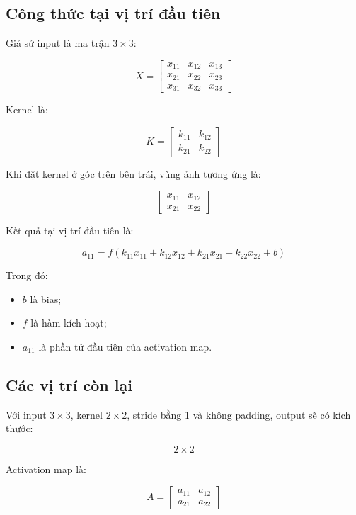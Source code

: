 \subsection{Công thức tại vị trí đầu tiên}

Giả sử input là ma trận $3 \times 3$:

\[
    X =
    \begin{bmatrix}
    x_{11} & x_{12} & x_{13}\\
    x_{21} & x_{22} & x_{23}\\
    x_{31} & x_{32} & x_{33}
    \end{bmatrix}
\]

Kernel là:

\[
    K =
    \begin{bmatrix}
    k_{11} & k_{12}\\
    k_{21} & k_{22}
    \end{bmatrix}
\]

Khi đặt kernel ở góc trên bên trái, vùng ảnh tương ứng là:

\[
    \begin{bmatrix}
    x_{11} & x_{12}\\
    x_{21} & x_{22}
    \end{bmatrix}
\]

Kết quả tại vị trí đầu tiên là:

\[
    a_{11}
    =
    f(
    k_{11}x_{11}
    +
    k_{12}x_{12}
    +
    k_{21}x_{21}
    +
    k_{22}x_{22}
    +
    b
    )
\]

Trong đó:

\begin{itemize}
    \item $b$ là bias;
    \item $f$ là hàm kích hoạt;
    \item $a_{11}$ là phần tử đầu tiên của activation map.
\end{itemize}

\subsection{Các vị trí còn lại}

Với input $3 \times 3$, kernel $2 \times 2$, stride bằng 1 và không padding, output sẽ có kích thước:

\[
    2 \times 2
\]

Activation map là:

\[
    A =
    \begin{bmatrix}
    a_{11} & a_{12}\\
    a_{21} & a_{22}
    \end{bmatrix}
\]

